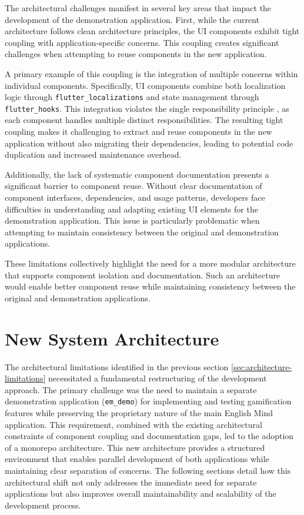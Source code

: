 The architectural challenges manifest in several key areas that impact the development of the demonstration application. First, while the current architecture follows clean architecture principles, the UI components exhibit tight coupling with application-specific concerns. This coupling creates significant challenges when attempting to reuse components in the new application.

A primary example of this coupling is the integration of multiple concerns within individual components. Specifically, UI components combine both localization logic through \texttt{flutter\_localizations} and state management through \texttt{flutter\_hooks}. This integration violates the single responsibility principle \cite{cite:solid_principles}, as each component handles multiple distinct responsibilities. The resulting tight coupling makes it challenging to extract and reuse components in the new application without also migrating their dependencies, leading to potential code duplication and increased maintenance overhead.

Additionally, the lack of systematic component documentation presents a significant barrier to component reuse. Without clear documentation of component interfaces, dependencies, and usage patterns, developers face difficulties in understanding and adapting existing UI elements for the demonstration application. This issue is particularly problematic when attempting to maintain consistency between the original and demonstration applications.

These limitations collectively highlight the need for a more modular architecture that supports component isolation and documentation. Such an architecture would enable better component reuse while maintaining consistency between the original and demonstration applications.
\newpage
\section{New System Architecture}
\label{sec:new-system-architecture}

The architectural limitations identified in the previous section \ref{sec:architecture-limitations} necessitated a fundamental restructuring of the development approach. The primary challenge was the need to maintain a separate demonstration application (\texttt{em\_demo}) for implementing and testing gamification features while preserving the proprietary nature of the main English Mind application. This requirement, combined with the existing architectural constraints of component coupling and documentation gaps, led to the adoption of a monorepo architecture. This new architecture provides a structured environment that enables parallel development of both applications while maintaining clear separation of concerns. The following sections detail how this architectural shift not only addresses the immediate need for separate applications but also improves overall maintainability and scalability of the development process.

